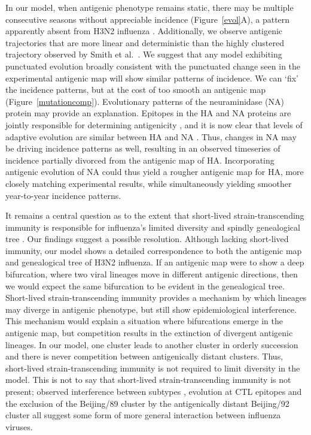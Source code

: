 \documentclass[11pt,oneside,letterpaper]{article}
\begin{document}
In our model, when antigenic phenotype remains static, there may be multiple consecutive seasons without appreciable incidence (Figure~\ref{evol}A), a pattern apparently absent from H3N2 influenza \cite{Finkelman07}.  Additionally, we observe antigenic trajectories that are more linear and deterministic than the highly clustered trajectory observed by Smith et al.\ \cite{Smith04}.  We suggest that any model exhibiting punctuated evolution broadly consistent with the punctuated change seen in the experimental antigenic map will show similar patterns of incidence.  We can `fix' the incidence patterns, but at the cost of too smooth an antigenic map (Figure~\ref{mutationcomp}).  Evolutionary patterns of the neuraminidase (NA) protein may provide an explanation.  Epitopes in the HA and NA proteins are jointly responsible for determining antigenicity \cite{Nelson07NatRevGenet}, and it is now clear that levels of adaptive evolution are similar between HA and NA \cite{Bhatt11}.  Thus, changes in NA may be driving incidence patterns as well, resulting in an observed timeseries of incidence partially divorced from the antigenic map of HA.  Incorporating antigenic evolution of NA could thus yield a rougher antigenic map for HA, more closely matching experimental results, while simultaneously yielding smoother year-to-year incidence patterns.

It remains a central question as to the extent that short-lived strain-transcending immunity is responsible for influenza's limited diversity and spindly genealogical tree \cite{Ferguson03,Tria05}.  Our findings suggest a possible resolution.  Although lacking short-lived immunity, our model shows a detailed correspondence to both the antigenic map and genealogical tree of H3N2 influenza.  If an antigenic map were to show a deep bifurcation, where two viral lineages move in different antigenic directions, then we would expect the same bifurcation to be evident in the genealogical tree.  Short-lived strain-transcending immunity provides a mechanism by which lineages may diverge in antigenic phenotype, but still show epidemiological interference.  This mechanism would explain a situation where bifurcations emerge in the antigenic map, but competition results in the extinction of divergent antigenic lineages.  In our model, one cluster leads to another cluster in orderly succession and there is never competition between antigenically distant clusters.  Thus, short-lived strain-transcending immunity is not required to limit diversity in the model.  This is not to say that short-lived strain-transcending immunity is not present; observed interference between subtypes \cite{Ferguson03,Goldstein11}, evolution at CTL epitopes \cite{Voeten00} and the exclusion of the Beijing/89 cluster by the antigenically distant Beijing/92 cluster \cite{Smith04} all suggest some form of more general interaction between influenza viruses.  
\end{document}
